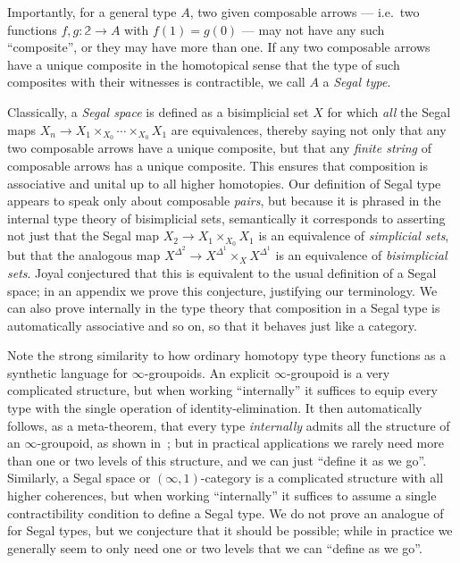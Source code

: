 \documentclass{amsart}
\theoremstyle{plain}
\theoremstyle{definition}
\theoremstyle{remark}
\numberwithin{equation}{section}
\newcommand{\two}{\mathbb{2}}
\begin{document}
Importantly, for a general type $A$, two given composable arrows --- i.e.\ two functions $f,g:\two\to A$ with $f(1)=g(0)$ --- may not have any such ``composite'', or they may have more than one.
If any two composable arrows have a unique composite in the homotopical sense that the type of such composites with their witnesses is contractible, we call $A$ a \emph{Segal type}.

Classically, a \emph{Segal space} is defined as a bisimplicial set $X$ for which \emph{all} the Segal maps $X_n \to X_1\times_{X_0}\cdots \times_{X_0} X_1$ are equivalences, thereby saying not only that any two composable arrows have a unique composite, but that any \emph{finite string} of composable arrows has a unique composite.
This ensures that composition is associative and unital up to all higher homotopies.
Our definition of Segal type appears to speak only about composable \emph{pairs}, but because it is phrased in the internal type theory of bisimplicial sets, semantically it corresponds to asserting not just that the Segal map $X_2 \to X_1\times_{X_0} X_1$ is an equivalence of \emph{simplicial sets}, but that the analogous map $X^{\Delta^2} \to X^{\Delta^1} \times_X X^{\Delta^1}$ is an equivalence of \emph{bisimplicial sets}.
Joyal conjectured that this is equivalent to the usual definition of a Segal space; in an appendix we prove this conjecture, justifying our terminology.
We can also prove internally in the type theory that composition in a Segal type is automatically associative and so on, so that it behaves just like a category.

Note the strong similarity to how ordinary homotopy type theory functions as a synthetic language for $\infty$-groupoids.
An explicit $\infty$-groupoid is a very complicated structure, but when working ``internally'' it suffices to equip every type with the single operation of identity-elimination.
It then automatically follows, as a meta-theorem, that every type \emph{internally} admits all the structure of an $\infty$-groupoid, as shown in~\cite{vdbg:oogpds,pll:oogpds}; but in practical applications we rarely need more than one or two levels of this structure, and we can just ``define it as we go''.
Similarly, a Segal space or $(\infty,1)$-category is a complicated structure with all higher coherences, but when working ``internally'' it suffices to assume a single contractibility condition to define a Segal type.
We do not prove an analogue of~\cite{vdbg:oogpds,pll:oogpds} for Segal types, but we conjecture that it should be possible; while in practice we generally seem to only need one or two levels that we can ``define as we go''.
\end{document}

